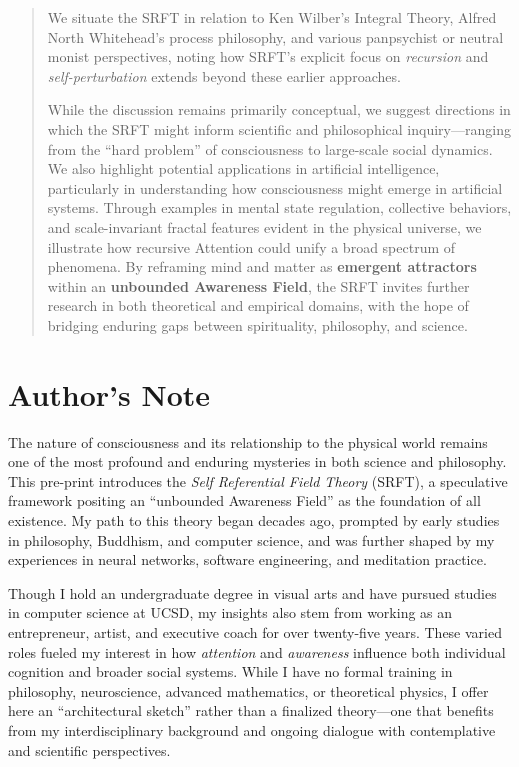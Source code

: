 \documentclass[12pt,a4paper]{article}
\begin{document}
\begin{abstract}
We situate the SRFT in relation to Ken Wilber’s Integral Theory, Alfred North Whitehead’s process philosophy, and various panpsychist or neutral monist perspectives, noting how SRFT’s explicit focus on \emph{recursion} and \emph{self-perturbation} extends beyond these earlier approaches.

While the discussion remains primarily conceptual, we suggest directions in which the SRFT might inform scientific and philosophical inquiry—ranging from the “hard problem” of consciousness to large-scale social dynamics. We also highlight potential applications in artificial intelligence, particularly in understanding how consciousness might emerge in artificial systems. Through examples in mental state regulation, collective behaviors, and scale-invariant fractal features evident in the physical universe, we illustrate how recursive Attention could unify a broad spectrum of phenomena. By reframing mind and matter as \textbf{emergent attractors} within an \textbf{unbounded Awareness Field}, the SRFT invites further research in both theoretical and empirical domains, with the hope of bridging enduring gaps between spirituality, philosophy, and science.
\end{abstract}

\section*{Author's Note}

The nature of consciousness and its relationship to the physical world remains one of the most profound and enduring mysteries in both science and philosophy. This pre-print introduces the \emph{Self Referential Field Theory} (SRFT), a speculative framework positing an “unbounded Awareness Field” as the foundation of all existence. My path to this theory began decades ago, prompted by early studies in philosophy, Buddhism, and computer science, and was further shaped by my experiences in neural networks, software engineering, and meditation practice.

Though I hold an undergraduate degree in visual arts and have pursued studies in computer science at UCSD, my insights also stem from working as an entrepreneur, artist, and executive coach for over twenty-five years. These varied roles fueled my interest in how \emph{attention} and \emph{awareness} influence both individual cognition and broader social systems. While I have no formal training in philosophy, neuroscience, advanced mathematics, or theoretical physics, I offer here an “architectural sketch” rather than a finalized theory—one that benefits from my interdisciplinary background and ongoing dialogue with contemplative and scientific perspectives.
\end{document}
